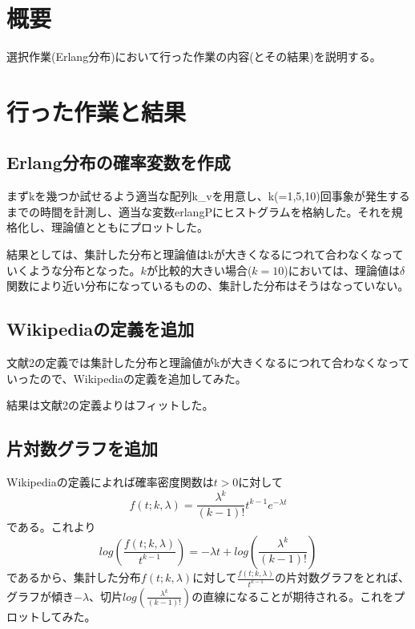 \documentclass[a4paper,twoside]{jarticle}
\begin{document}

\maketitle

\section{概要}
選択作業(Erlang分布)において行った作業の内容(とその結果)を説明する。

\section{行った作業と結果}

\subsection{Erlang分布の確率変数を作成}\label{ss-erlang}
まずkを幾つか試せるよう適当な配列k\_vを用意し、k(=1,5,10)回事象が発生するまでの時間を計測し、適当な変数erlangPにヒストグラムを格納した。それを規格化し、理論値とともにプロットした。

結果としては、集計した分布と理論値はkが大きくなるにつれて合わなくなっていくような分布となった。$k$が比較的大きい場合($k=10$)においては、理論値は$\delta$関数により近い分布になっているものの、集計した分布はそうはなっていない。

\subsection{Wikipediaの定義を追加}\label{ss-wiki}
文献2の定義では集計した分布と理論値がkが大きくなるにつれて合わなくなっていったので、Wikipedia\cite{wiki-erlang}の定義を追加してみた。

結果は文献2の定義よりはフィットした。

\subsection{片対数グラフを追加}\label{ss-log}
Wikipedia\cite{wiki-erlang}の定義によれば確率密度関数は$t >0$に対して
\begin{equation}
  f(t;k,\lambda)=\frac{\lambda^{k}}{(k-1)!}t^{k-1}e^{-\lambda t}
\end{equation}
である。これより
\begin{equation}
  log{\left(\frac{f(t;k,\lambda)}{t^{k-1}}\right)} = -\lambda t+log{\left(\frac{\lambda^{k}}{(k-1)!}\right)}
\end{equation}
であるから、集計した分布$f(t;k,\lambda)$に対して$\frac{f(t;k,\lambda)}{t^{k-1}}$の片対数グラフをとれば、グラフが傾き$-\lambda$、切片$log{\left(\frac{\lambda^{k}}{(k-1)!}\right)}$の直線になることが期待される。これをプロットしてみた。
\end{document}
